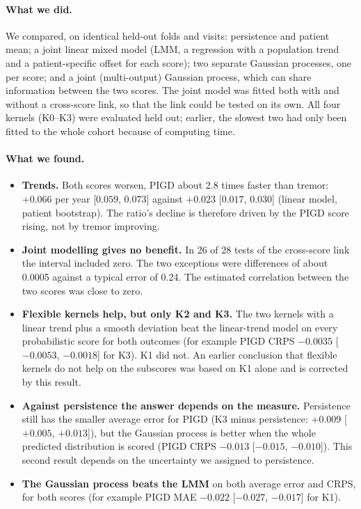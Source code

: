 \documentclass[11pt,a4paper]{article}
\begin{document}
\paragraph{What we did.} We compared, on identical held-out folds and visits:
persistence and patient mean; a joint linear mixed model (LMM, a regression with
a population trend and a patient-specific offset for each score); two separate
Gaussian processes, one per score; and a joint (multi-output) Gaussian process,
which can share information between the two scores. The joint model was fitted
both with and without a cross-score link, so that the link could be tested on
its own. All four kernels (K0--K3) were evaluated held out; earlier, the
slowest two had only been fitted to the whole cohort because of computing time.

\paragraph{What we found.}

\begin{itemize}
  \item \textbf{Trends.} Both scores worsen, PIGD about 2.8 times faster than
        tremor: $+0.066$ per year [$0.059$, $0.073$] against $+0.023$ [$0.017$,
        $0.030$] (linear model, patient bootstrap). The ratio's decline is
        therefore driven by the PIGD score rising, not by tremor improving.
  \item \textbf{Joint modelling gives no benefit.} In 26 of 28 tests of the
        cross-score link the interval included zero. The two exceptions were
        differences of about 0.0005 against a typical error of 0.24. The
        estimated correlation between the two scores was close to zero.
  \item \textbf{Flexible kernels help, but only K2 and K3.} The two kernels with a
        linear trend plus a smooth deviation beat the linear-trend model on
        every probabilistic score for both outcomes (for example PIGD CRPS
        $-0.0035$ [$-0.0053$, $-0.0018$] for K3). K1 did not. An earlier
        conclusion that flexible kernels do not help on the subscores was based
        on K1 alone and is corrected by this result.
  \item \textbf{Against persistence the answer depends on the measure.}
        Persistence still has the smaller average error for PIGD (K3 minus
        persistence: $+0.009$ [$+0.005$, $+0.013$]), but the Gaussian process
        is better when the whole predicted distribution is scored (PIGD CRPS
        $-0.013$ [$-0.015$, $-0.010$]). This second result depends on the
        uncertainty we assigned to persistence.
  \item \textbf{The Gaussian process beats the LMM} on both average error and
        CRPS, for both scores (for example PIGD MAE $-0.022$ [$-0.027$, $-0.017$] for K1).
\end{itemize}
\end{document}
